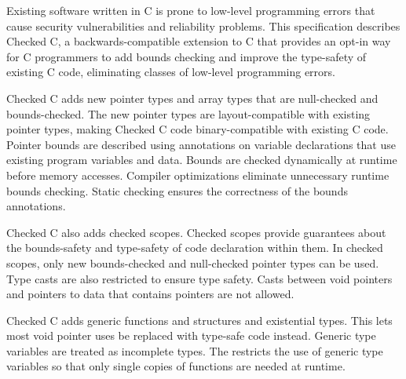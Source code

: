 
\parbox{5.5in}{
Existing software written in C is prone to low-level programming
errors that cause security vulnerabilities and reliability
problems.  This specification describes Checked C, a backwards-compatible
extension to C that provides an opt-in way for C programmers to add
bounds checking and improve the type-safety of existing C code, 
eliminating classes of low-level programming errors.
}

\vspace{11pt}

\parbox{5.5in}{
Checked C adds new pointer types and array types that are
null-checked and bounds-checked. The new pointer types
are layout-compatible with existing pointer
types, making Checked C code binary-compatible with existing C code.
Pointer bounds are described using annotations on variable
declarations that use existing program variables and data.
Bounds are checked dynamically at runtime before memory accesses.
Compiler optimizations eliminate unnecessary runtime bounds checking.
Static checking ensures the correctness of the bounds annotations.}

\vspace{11pt}

\parbox{5.5in}{Checked C also adds checked scopes. Checked scopes
provide guarantees about the bounds-safety and type-safety of code
declaration within them. In checked
scopes, only new bounds-checked and null-checked pointer types
can be used.  Type casts are also restricted to ensure type
safety.  Casts between void pointers and pointers to
 data that contains pointers are not allowed.}

\vspace{11pt}
\parbox{5.5in}{Checked C adds
generic functions and structures and existential types.
This lets most void pointer uses be replaced with type-safe code
instead.  Generic type variables are treated as incomplete types.
The restricts the use of generic type variables so that only 
single copies of functions are needed at runtime.
}



